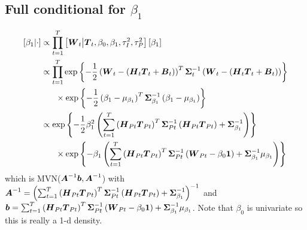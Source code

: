\documentclass{article}\usepackage[]{graphicx}\usepackage[]{color}
\def\bm#1{\mbox{\boldmath $#1$}}
\begin{document}
\subsection{Full conditional for $\beta_1$}
%
\begin{align*}
%
\left[ \beta_1 \middle| \cdot \right] & \propto \prod_{t = 1}^T \left[ \bm{W}_t \middle| \bm{T}_t, \beta_0, \beta_1, \tau^2_I, \tau^2_P \right] \left[ \beta_1 \right]\\
%
& \propto \prod_{t = 1}^T \exp{ \left\{ - \frac{1} {2} \left( \bm{W}_t - \left( \bm{H}_t \bm{T}_t + \bm{B}_t \right) \right)^T \bm{\Sigma}_t^{ - 1} \left( \bm{W}_t - \left( \bm{H}_t \bm{T}_t + \bm{B}_t \right) \right) \right\} }\\
& \hspace{6mm} \times \exp{ \left\{ - \frac{1} {2} \left( \beta_1 - \mu_{\beta_1} \right)^T \bm{\Sigma}_{\beta_1}^{ - 1} \left( \beta_1 - \mu_{\beta_1} \right) \right\} }\\
%
& \propto \exp{ \left\{ - \frac{1} {2} \beta_1^2 \left( \sum_{t = 1}^T \left( \bm{H}_{Pt} \bm{T}_{Pt} \right)^T \bm{\Sigma}_{Pt}^{ - 1} \left( \bm{H}_{Pt} \bm{T}_{Pt} \right) + \bm{\Sigma}_{\beta_1}^{ - 1} \right) \right\} }\\
& \hspace{6mm} \times \exp{ \left\{ - \beta_1 \left( \sum_{t = 1}^T \left( \bm{H}_{Pt} \bm{T}_{Pt} \right)^T \bm{\Sigma}_{Pt}^{ - 1} \left( \bm{W}_{Pt} - \beta_0 \bm{1} \right) + \bm{\Sigma}_{\beta_1}^{ - 1} \mu_{\beta_1} \right) \right\} }\\
%
\end{align*}
%
which is MVN($\bm{A}^{ - 1}\bm{b}, \bm{A}^{ - 1}$) with $\bm{A}^{ - 1} = \left( \sum_{t = 1}^T \left( \bm{H}_{Pt} \bm{T}_{Pt} \right)^T \bm{\Sigma}_{Pt}^{ - 1} \left( \bm{H}_{Pt} \bm{T}_{Pt} \right) + \bm{\Sigma}_{\beta_1}^{ - 1} \right)^{ - 1}$ and $\bm{b} = \sum_{t = 1}^T \left( \bm{H}_{Pt} \bm{T}_{Pt} \right)^T \bm{\Sigma}_{Pt}^{ - 1} \left( \bm{W}_{Pt} - \beta_0 \bm{1} \right) + \bm{\Sigma}_{\beta_1}^{ - 1} \mu_{\beta_1}$. Note that $\beta_0$ is univariate so this is really a 1-d density.
%
%
\end{document}
